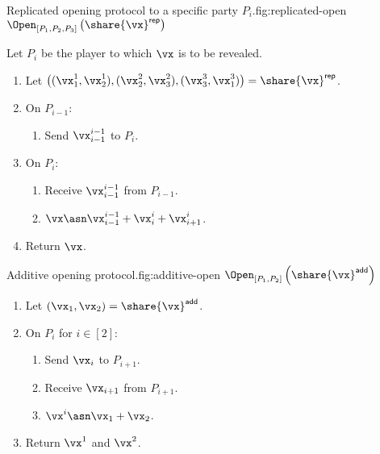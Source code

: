 \begin{Boxfig}{Replicated opening protocol to a specific party $P_i$.}{fig:replicated-open}
  {$\Open_{[P_1, P_2, P_3]} \left( \share{\vx}^{\mathsf{rep}} \right)$}
  
  Let $P_i$ be the player to which $\vx$ is to be revealed.
  
  \begin{enumerate}
  \item Let $\left( (\vx_1^1, \vx_2^1), (\vx_2^2, \vx_3^2), (\vx_3^3, \vx_1^3) \right) = \share{\vx}^{\mathsf{rep}}$.
  \item On $P_{i-1}$:
  \begin{enumerate}
    \item Send $\vx_{i-1}^{i-1}$ to $P_{i}$.
  \end{enumerate}
  \item On $P_i$:
  \begin{enumerate}
   \item Receive $\vx_{i-1}^{i-1}$ from $P_{i-1}$.
   \item $\vx \asn \vx_{i-1}^{i-1} + \vx_i^i + \vx_{i+1}^{i}$.
  \end{enumerate}
  \item Return $\vx$.
\end{enumerate}
\end{Boxfig}


\begin{Boxfig}{Additive opening protocol.}{fig:additive-open}
  {$\Open_{[P_1, P_2]} \left( \share{\vx}^{\mathsf{add}} \right)$}
  \begin{enumerate}
  \item Let $(\vx_1, \vx_2) = \share{\vx}^{\mathsf{add}}$.
  \item On $P_i$ for $i \in [2]$:
  \begin{enumerate}
    \item Send $\vx_i$ to $P_{i+1}$.
    \item Receive $\vx_{i+1}$ from $P_{i+1}$.
    \item $\vx^i \asn \vx_1 + \vx_2$.
  \end{enumerate}
  \item Return $\vx^1$ and $\vx^2$.
\end{enumerate}
\end{Boxfig}

